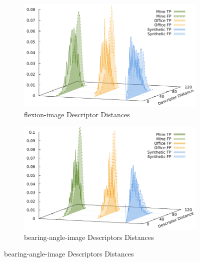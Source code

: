 \begin{figure}[H]
\begin{subfigure}[t]{0.45\linewidth}
    \includegraphics[width=\linewidth]{chapter06/results/ORB/flexion/descriptor_distances.pdf}%
    \caption{\gls{flexion-image} Descriptor Distances}
\end{subfigure}\quad
\begin{subfigure}[t]{0.45\linewidth}
    \includegraphics[width=\linewidth]{chapter06/results/ORB/bearing/descriptor_distances.pdf}%
    \caption{\gls{bearing-angle-image} Descriptors Distances}
\end{subfigure}
\end{figure}

